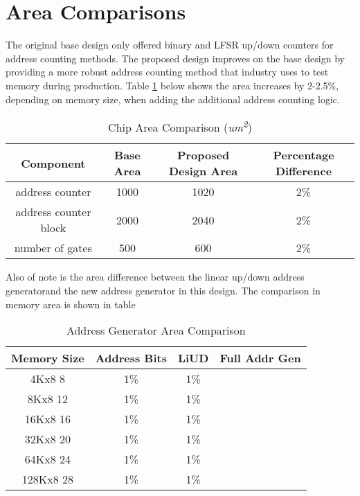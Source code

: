 \section{Area Comparisons}
\label{sect:cln-area}
The original base design only offered binary and LFSR up/down counters for address counting methods.  The proposed design improves on the base design by providing a more robust address counting method that industry uses to test memory during production.  Table \ref{table:area_compare} below shows the area increases by  2-2.5\%, depending on memory size, when adding the additional address counting logic.

\begin{table}[ht]
\caption{Chip Area Comparison (\textit{um\textsuperscript{2}})}
\centering
\begin{tabular}{c c c c}
\hline\hline
Component & Base Area & Proposed Design Area & Percentage Difference \\ [0.5ex]
\hline
address counter       & 1000 & 1020 & 2\% \\
address counter block & 2000 & 2040 & 2\% \\ [1ex]
\hline\hline
number of gates       & 500  & 600  & 2\% \\ [1ex] 
\end{tabular}
\label{table:area_compare}
\end{table}

Also of note is the area difference between the linear up/down address generatorand the new address generator in this design.  The comparison in memory area is shown in table

\begin{table}[ht]
\caption{Address Generator Area Comparison}
\centering
\begin{tabular}{c c c c}
\hline\hline
Memory Size & Address Bits & LiUD & Full Addr Gen \\ [0.5ex]

\hline
4Kx8      8  & 1\% & 1\%  \\
8Kx8      12  & 1\% & 1\%  \\
16Kx8     16   & 1\% & 1\%  \\
32Kx8     20   & 1\% & 1\%  \\
64Kx8     24   & 1\% & 1\%  \\
128Kx8    28    & 1\% & 1\%  \\ [1ex]
\end{tabular}
\label{table:addr_gen_compare}
\end{table}


